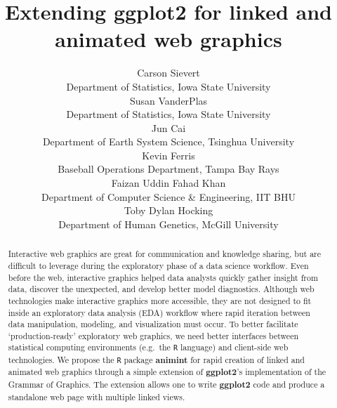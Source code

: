 \documentclass[12pt,]{article}
\theoremstyle{definition}
\theoremstyle{definition}
\theoremstyle{definition}
\theoremstyle{remark}
\begin{document}
\def\spacingset#1{\renewcommand{\baselinestretch}%
{#1}\small\normalsize} \spacingset{1}

\title{\bf Extending ggplot2 for linked and animated web graphics}
\author{
  Carson Sievert \\ 
  Department of Statistics, Iowa State University \\
  Susan VanderPlas \\
  Department of Statistics, Iowa State University \\
  Jun Cai \\
  Department of Earth System Science, Tsinghua University\\
  Kevin Ferris \\
  Baseball Operations Department, Tampa Bay Rays \\
  Faizan Uddin Fahad Khan \\
  Department of Computer Science \& Engineering, IIT BHU \\
  Toby Dylan Hocking \\ 
  Department of Human Genetics, McGill University \\
}
\maketitle

\bigskip
\begin{abstract}
Interactive web graphics are great for communication and knowledge
sharing, but are difficult to leverage during the exploratory phase of a
data science workflow. Even before the web, interactive graphics helped
data analysts quickly gather insight from data, discover the unexpected,
and develop better model diagnostics. Although web technologies make
interactive graphics more accessible, they are not designed to fit
inside an exploratory data analysis (EDA) workflow where rapid iteration
between data manipulation, modeling, and visualization must occur. To
better facilitate `production-ready' exploratory web graphics, we need
better interfaces between statistical computing environments (e.g.~the
\texttt{R} language) and client-side web technologies. We propose the
\texttt{R} package \textbf{animint} for rapid creation of linked and
animated web graphics through a simple extension of \textbf{ggplot2}'s
implementation of the Grammar of Graphics. The extension allows one to
write \textbf{ggplot2} code and produce a standalone web page with
multiple linked views.
\end{abstract}
\end{document}
